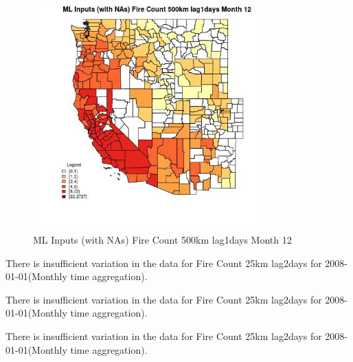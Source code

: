 \begin{figure} 
\centering  
\includegraphics[width=0.77\textwidth]{Code_Outputs/Report_ML_input_PM25_Step4_part_f_de_duplicated_aves_prioritize_24hr_obswNAs_CountyFire_Count_500km_lag1daysmedianMonth12.jpg} 
\caption{\label{fig:Report_ML_input_PM25_Step4_part_f_de_duplicated_aves_prioritize_24hr_obswNAsCountyFire_Count_500km_lag1daysmedianMonth12}ML Inputs (with NAs) Fire Count 500km lag1days Month 12} 
\end{figure} 
 

There is insufficient variation in the data for Fire Count 25km lag2days for 2008-01-01(Monthly time aggregation). 
 

There is insufficient variation in the data for Fire Count 25km lag2days for 2008-01-01(Monthly time aggregation). 
 

There is insufficient variation in the data for Fire Count 25km lag2days for 2008-01-01(Monthly time aggregation). 
 

